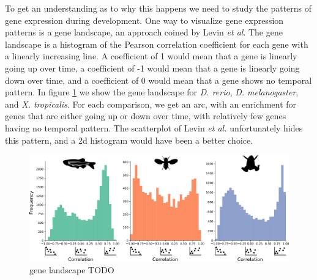 To get an understanding as to why this happens we need to study the patterns of gene expression during development. One way to visualize gene expression patterns is a gene landscape, an approach coined by Levin \textit{et al}. The gene landscape is a histogram of the Pearson correlation coefficient for each gene with a linearly increasing line. A coefficient of 1 would mean that a gene is linearly going up over time, a coefficient of -1 would mean that a gene is linearly going down over time, and a coefficient of 0 would mean that a gene shows no temporal pattern. In figure \ref{fig:genelandscape} we show the gene landscape for \textit{D. rerio}, \textit{D. melanogaster}, and \textit{X. tropicalis}. For each comparison, we get an arc, with an enrichment for genes that are either going up or down over time, with relatively few genes having no temporal pattern. The scatterplot of Levin \textit{et al.} unfortunately hides this pattern, and a 2d histogram would have been a better choice. 

\begin{figure}[H]
    \includegraphics[width=\linewidth]{ch4.hourglass/images/gene_landscape.png}
    \caption{gene landscape TODO}
    \label{fig:genelandscape}
\end{figure}


